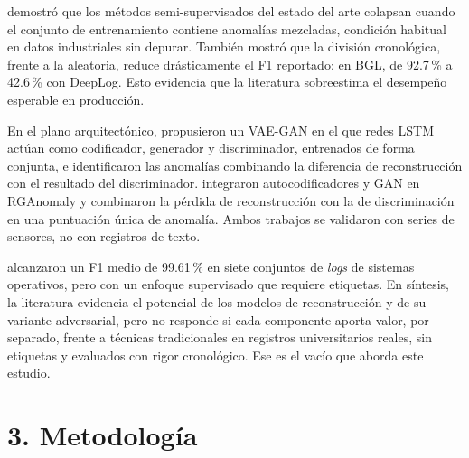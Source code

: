\documentclass[jou,a4paper,floatsintext,donotrepeattitle]{apa7}
\begin{document}
\textcite{albert2025} demostró que los métodos semi-supervisados del estado del arte colapsan cuando el conjunto de entrenamiento contiene anomalías mezcladas, condición habitual en datos industriales sin depurar. También mostró que la división cronológica, frente a la aleatoria, reduce drásticamente el F1 reportado: en BGL, de 92.7\,\% a 42.6\,\% con DeepLog. Esto evidencia que la literatura sobreestima el desempeño esperable en producción.

En el plano arquitectónico, \textcite{niu2020} propusieron un VAE-GAN en el que redes LSTM actúan como codificador, generador y discriminador, entrenados de forma conjunta, e identificaron las anomalías combinando la diferencia de reconstrucción con el resultado del discriminador. \textcite{qian2025} integraron autocodificadores y GAN en RGAnomaly y combinaron la pérdida de reconstrucción con la de discriminación en una puntuación única de anomalía. Ambos trabajos se validaron con series de sensores, no con registros de texto.

\textcite{nasirzadeh2025} alcanzaron un F1 medio de 99.61\,\% en siete conjuntos de \textit{logs} de sistemas operativos, pero con un enfoque supervisado que requiere etiquetas. En síntesis, la literatura evidencia el potencial de los modelos de reconstrucción y de su variante adversarial, pero no responde si cada componente aporta valor, por separado, frente a técnicas tradicionales en registros universitarios reales, sin etiquetas y evaluados con rigor cronológico. Ese es el vacío que aborda este estudio.

\section{3. Metodología}
\end{document}
